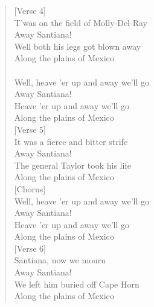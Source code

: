 \documentclass[11pt]{article}
\begin{document}
\begin{verse}
[Verse 4]\\
T'was on the field of Molly-Del-Ray\\
Away Santiana!\\
Well both his legs got blown away\\
Along the plains of Mexico\\
[Chorus]\\
Well, heave 'er up and away we'll go\\
Away Santiana!\\
Heave 'er up and away we'll go\\
Along the plains of Mexico\\
\vspace*{1em}
[Verse 5]\\
It was a fierce and bitter strife\\
Away Santiana!\\
The general Taylor took his life\\
Along the plains of Mexico\\
\vspace*{1em}
[Chorus]\\
Well, heave 'er up and away we'll go\\
Away Santiana!\\
Heave 'er up and away we'll go\\
Along the plains of Mexico\\
\vspace*{1em}
[Verse 6]\\
Santiana, now we mourn\\
Away Santiana!\\
We left him buried off Cape Horn\\
Along the plains of Mexico\\
\end{verse}
\clearpage
\end{document}
